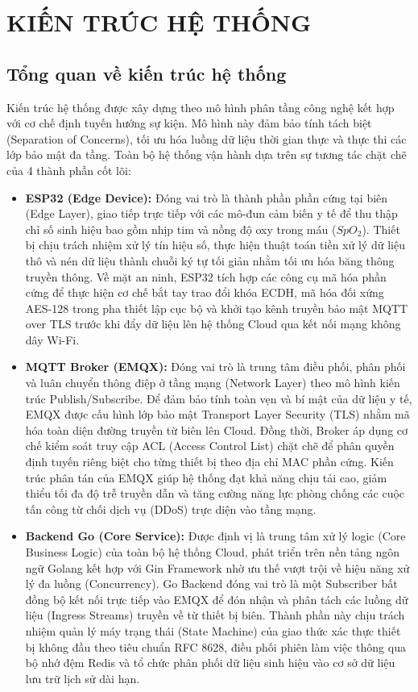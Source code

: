\documentclass[a4paper,13pt,3p,oneside]{report}
\begin{document}
\chapter{KIẾN TRÚC HỆ THỐNG}
\section{Tổng quan về kiến trúc hệ thống}
Kiến trúc hệ thống được xây dựng theo mô hình phân tầng công nghệ kết hợp với cơ chế định tuyến hướng sự kiện. Mô hình này đảm bảo tính tách biệt (Separation of Concerns), tối ưu hóa luồng dữ liệu thời gian thực và thực thi các lớp bảo mật đa tầng. Toàn bộ hệ thống vận hành dựa trên sự tương tác chặt chẽ của 4 thành phần cốt lõi:

\begin{itemize}
    \item \textbf{ESP32 (Edge Device):} Đóng vai trò là thành phần phần cứng tại biên (Edge Layer), giao tiếp trực tiếp với các mô-đun cảm biến y tế để thu thập chỉ số sinh hiệu bao gồm nhịp tim và nồng độ oxy trong máu ($SpO_2$). Thiết bị chịu trách nhiệm xử lý tín hiệu số, thực hiện thuật toán tiền xử lý dữ liệu thô và nén dữ liệu thành chuỗi ký tự tối giản nhằm tối ưu hóa băng thông truyền thông. Về mặt an ninh, ESP32 tích hợp các công cụ mã hóa phần cứng để thực hiện cơ chế bắt tay trao đổi khóa ECDH, mã hóa đối xứng AES-128 trong pha thiết lập cục bộ và khởi tạo kênh truyền bảo mật MQTT over TLS trước khi đẩy dữ liệu lên hệ thống Cloud qua kết nối mạng không dây Wi-Fi.
    
    \item \textbf{MQTT Broker (EMQX):} Đóng vai trò là trung tâm điều phối, phân phối và luân chuyển thông điệp ở tầng mạng (Network Layer) theo mô hình kiến trúc Publish/Subscribe. Để đảm bảo tính toàn vẹn và bí mật của dữ liệu y tế, EMQX được cấu hình lớp bảo mật Transport Layer Security (TLS) nhằm mã hóa toàn diện đường truyền từ biên lên Cloud. Đồng thời, Broker áp dụng cơ chế kiểm soát truy cập ACL (Access Control List) chặt chẽ để phân quyền định tuyến riêng biệt cho từng thiết bị theo địa chỉ MAC phần cứng. Kiến trúc phân tán của EMQX giúp hệ thống đạt khả năng chịu tải cao, giảm thiểu tối đa độ trễ truyền dẫn và tăng cường năng lực phòng chống các cuộc tấn công từ chối dịch vụ (DDoS) trực diện vào tầng mạng.
    
    \item \textbf{Backend Go (Core Service):} Được định vị là trung tâm xử lý logic (Core Business Logic) của toàn bộ hệ thống Cloud, phát triển trên nền tảng ngôn ngữ Golang kết hợp với Gin Framework nhờ ưu thế vượt trội về hiệu năng xử lý đa luồng (Concurrency). Go Backend đóng vai trò là một Subscriber bất đồng bộ kết nối trực tiếp vào EMQX để đón nhận và phân tách các luồng dữ liệu (Ingress Streams) truyền về từ thiết bị biên. Thành phần này chịu trách nhiệm quản lý máy trạng thái (State Machine) của giao thức xác thực thiết bị không đầu theo tiêu chuẩn RFC 8628, điều phối phiên làm việc thông qua bộ nhớ đệm Redis và tổ chức phân phối dữ liệu sinh hiệu vào cơ sở dữ liệu lưu trữ lịch sử dài hạn.
    

\end{itemize}
\end{document}
